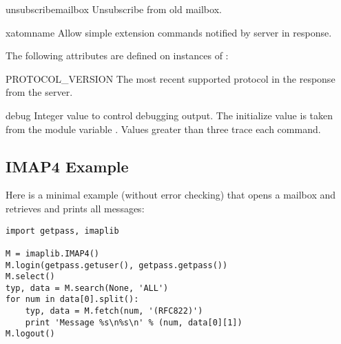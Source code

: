 \begin{methoddesc}{unsubscribe}{mailbox}
  Unsubscribe from old mailbox.
\end{methoddesc}

\begin{methoddesc}{xatom}{name}
  Allow simple extension commands notified by server in
   response.
\end{methoddesc}


The following attributes are defined on instances of :


\begin{memberdesc}{PROTOCOL_VERSION}
The most recent supported protocol in the
 response from the server.
\end{memberdesc}

\begin{memberdesc}{debug}
Integer value to control debugging output.  The initialize value is
taken from the module variable .  Values greater than
three trace each command.
\end{memberdesc}


\subsection{IMAP4 Example \label{imap4-example}}

Here is a minimal example (without error checking) that opens a
mailbox and retrieves and prints all messages:

\begin{verbatim}
import getpass, imaplib

M = imaplib.IMAP4()
M.login(getpass.getuser(), getpass.getpass())
M.select()
typ, data = M.search(None, 'ALL')
for num in data[0].split():
    typ, data = M.fetch(num, '(RFC822)')
    print 'Message %s\n%s\n' % (num, data[0][1])
M.logout()
\end{verbatim}
